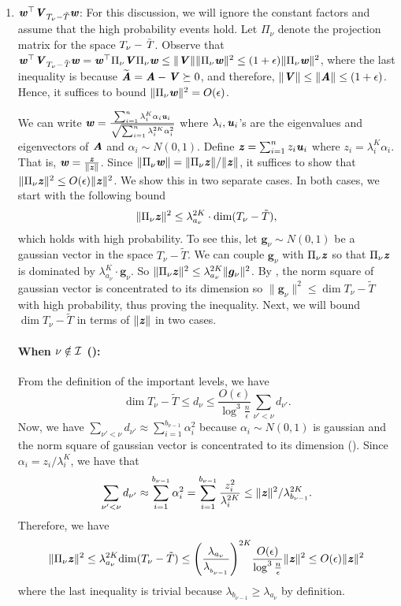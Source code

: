 \begin{enumerate}
    \item $\ww^{\top}\VV_{T_{\nu} -\tilde{T}}\ww$: For this discussion, we will ignore the constant factors and assume that the high probability events hold. Let $\Pi_{\nu}$ denote the projection matrix for the space $T_{\nu}-\Ttil$. Observe that $\ww^{\top}\VV_{T_{\nu}-\Ttil}\ww=\ww^{\top}\Pi_{\nu}\VV\Pi_{\nu}\ww\le\|\VV\|\|\Pi_{\nu}\ww\|^2 \le (1+\epsilon)\|\Pi_{\nu}\ww\|^2$, where the last inequality is because $\AAtil=\AA-\VV\succeq0$, and therefore, $\|\VV\|\le\|\AA\|\le(1+\epsilon)$. Hence, it suffices to bound $\|\Pi_{\nu}\ww\|^2 = O(\epsilon)$. 

We can write $\ensuremath{\ww=\frac{\sum_{i=1}^{n}\lambda_{i}^{K}\alpha_{i}\uu_{i}}{\sqrt{\sum_{i=1}^{n}\lambda_{i}^{2K}\alpha_{i}^{2}}}}$ where $\lambda_{i},\uu_{i}$'s are the eigenvalues and eigenvectors of $\AA$ and $\alpha_{i}\sim N(0,1)$. 
Define $\zz = \sum_{i=1}^n z_i \uu_i$ where $z_i = \lambda_i^K\alpha_i$. That is, 
$\ww=\frac{\zz}{\|\zz\|}$. Since $\|\Pi_{\nu}\ww\| = \|\Pi_{\nu}\zz\|/\|\zz\|$, it suffices to show that $\|\Pi_{\nu}\zz\|^2 \le O(\epsilon) \| \zz\|^2$. We show this in two separate cases. In both cases, we start with the following bound
\[
\|\Pi_{\nu}\zz\|^{2}\le\lambda_{a_{\nu}}^{2K}\cdot\dim{T_{\nu}-\tilde{T}},
\]
which holds with high probability. To see this, let $\boldsymbol{g}_{\nu}\sim N(0,1)$ be a gaussian vector in the space $T_{\nu}-\tilde{T}$. 
We can couple $\textbf{g}_\nu$ with $\Pi_{\nu}\zz$ so that $\Pi_{\nu}\zz$ is dominated by $\lambda_{a_{\nu}}^{K}\cdot \boldsymbol{g}_{\nu}$. So $\|\Pi_{\nu}\zz\|^{2}\le\lambda_{a_{\nu}}^{2K}\|\boldsymbol{g}_{\nu}\|^{2}$. By , the norm square of gaussian vector is concentrated to its dimension so $\|\boldsymbol{g}_{\nu}\|^{2}\le\dim{T_{\nu}-\tilde{T}}$ with high probability, thus proving the inequality. Next, we will bound $\dim{T_{\nu}-\tilde{T}}$ in terms of $\|\zz\|$ in two cases. 

\paragraph{When $\nu\protect\notin{\cal I}$ ():}

From the definition of the important levels, we have 
\[
\dim{T_{\nu}-\tilde{T}}\leq d_{\nu}\leq\frac{O(\epsilon)}{\log^{3}\frac{n}{\epsilon}}\sum_{\nu'<\nu}d_{\nu'}.
\]
Now, we have $\sum_{\nu'<\nu}d_{\nu'}\approx\sum_{i=1}^{b_{\nu-1}}\alpha_{i}^{2}$ because $\alpha_{i}\sim N(0,1)$ is gaussian and the norm square of gaussian vector is concentrated to its dimension (). Since $\alpha_{i}=z_{i}/\lambda_{i}^{K}$, we have that
\[
\sum_{\nu'<\nu}d_{\nu'}\approx\sum_{i=1}^{b_{\nu-1}}\alpha_{i}^{2}=\sum_{i=1}^{b_{\nu-1}}\frac{z_{i}^{2}}{\lambda_{i}^{2K}}\le\|\zz\|^{2}/\lambda_{b_{\nu-1}}^{2K}.
\]
Therefore, we have 
\[
\|\Pi_{\nu}\zz\|^2 \le\lambda_{a_{\nu}}^{2K}\dim{T_{\nu}-\tilde{T}}\le\left(\frac{\lambda_{a_{\nu}}}{\lambda_{_{b_{\nu-1}}}}\right)^{2K}\frac{O(\epsilon)}{\log^{3}\frac{n}{\epsilon}}\|\zz\|^{2}\le O(\epsilon)\|\zz\|^{2}
\]
where the last inequality is trivial because $\lambda_{b_{\nu-1}}\ge\lambda_{a_{\nu}}$ by definition.


\end{enumerate}
